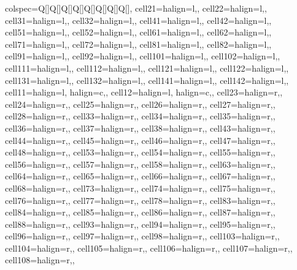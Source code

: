 \begin{table}
\centering
\begin{talltblr}[         %
caption={Descriptive statistics of respondent characteristics, by treatment group status (framing experiment)\label{tab:balance-table-framing-experiment}},
]                     %
{                     %
colspec={Q[]Q[]Q[]Q[]Q[]Q[]Q[]Q[]},
cell{2}{1}={}{halign=l,},
cell{2}{2}={}{halign=l,},
cell{3}{1}={}{halign=l,},
cell{3}{2}={}{halign=l,},
cell{4}{1}={}{halign=l,},
cell{4}{2}={}{halign=l,},
cell{5}{1}={}{halign=l,},
cell{5}{2}={}{halign=l,},
cell{6}{1}={}{halign=l,},
cell{6}{2}={}{halign=l,},
cell{7}{1}={}{halign=l,},
cell{7}{2}={}{halign=l,},
cell{8}{1}={}{halign=l,},
cell{8}{2}={}{halign=l,},
cell{9}{1}={}{halign=l,},
cell{9}{2}={}{halign=l,},
cell{10}{1}={}{halign=l,},
cell{10}{2}={}{halign=l,},
cell{11}{1}={}{halign=l,},
cell{11}{2}={}{halign=l,},
cell{12}{1}={}{halign=l,},
cell{12}{2}={}{halign=l,},
cell{13}{1}={}{halign=l,},
cell{13}{2}={}{halign=l,},
cell{14}{1}={}{halign=l,},
cell{14}{2}={}{halign=l,},
cell{1}{1}={}{halign=l, halign=c,},
cell{1}{2}={}{halign=l, halign=c,},
cell{2}{3}={}{halign=r,},
cell{2}{4}={}{halign=r,},
cell{2}{5}={}{halign=r,},
cell{2}{6}={}{halign=r,},
cell{2}{7}={}{halign=r,},
cell{2}{8}={}{halign=r,},
cell{3}{3}={}{halign=r,},
cell{3}{4}={}{halign=r,},
cell{3}{5}={}{halign=r,},
cell{3}{6}={}{halign=r,},
cell{3}{7}={}{halign=r,},
cell{3}{8}={}{halign=r,},
cell{4}{3}={}{halign=r,},
cell{4}{4}={}{halign=r,},
cell{4}{5}={}{halign=r,},
cell{4}{6}={}{halign=r,},
cell{4}{7}={}{halign=r,},
cell{4}{8}={}{halign=r,},
cell{5}{3}={}{halign=r,},
cell{5}{4}={}{halign=r,},
cell{5}{5}={}{halign=r,},
cell{5}{6}={}{halign=r,},
cell{5}{7}={}{halign=r,},
cell{5}{8}={}{halign=r,},
cell{6}{3}={}{halign=r,},
cell{6}{4}={}{halign=r,},
cell{6}{5}={}{halign=r,},
cell{6}{6}={}{halign=r,},
cell{6}{7}={}{halign=r,},
cell{6}{8}={}{halign=r,},
cell{7}{3}={}{halign=r,},
cell{7}{4}={}{halign=r,},
cell{7}{5}={}{halign=r,},
cell{7}{6}={}{halign=r,},
cell{7}{7}={}{halign=r,},
cell{7}{8}={}{halign=r,},
cell{8}{3}={}{halign=r,},
cell{8}{4}={}{halign=r,},
cell{8}{5}={}{halign=r,},
cell{8}{6}={}{halign=r,},
cell{8}{7}={}{halign=r,},
cell{8}{8}={}{halign=r,},
cell{9}{3}={}{halign=r,},
cell{9}{4}={}{halign=r,},
cell{9}{5}={}{halign=r,},
cell{9}{6}={}{halign=r,},
cell{9}{7}={}{halign=r,},
cell{9}{8}={}{halign=r,},
cell{10}{3}={}{halign=r,},
cell{10}{4}={}{halign=r,},
cell{10}{5}={}{halign=r,},
cell{10}{6}={}{halign=r,},
cell{10}{7}={}{halign=r,},
cell{10}{8}={}{halign=r,},
}
\end{talltblr}
\end{table}
